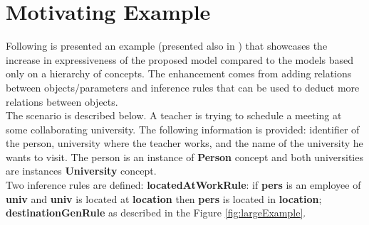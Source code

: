 \documentclass[12pt]{article}
\theoremstyle{definition}
\begin{document}
\section{Motivating Example}
Following is presented an example (presented also in \cite{paulRelational}) that showcases the increase in expressiveness of the proposed model compared to the models based only on a hierarchy of concepts. The enhancement comes from adding relations between objects/parameters and inference rules that can be used to deduct more relations between objects. \\
The scenario is described below. A teacher is trying to schedule a meeting at some collaborating university. The following information is provided: identifier of the person, university where the teacher works, and the name of the university he wants to visit. The person is an instance of \textbf{Person} concept and both universities are instances \textbf{University} concept. \\
Two inference rules are defined: \textbf{locatedAtWorkRule}: if \textbf{pers} is an employee of \textbf{univ} and \textbf{univ} is located at \textbf{location} then \textbf{pers} is located in \textbf{location}; \textbf{destinationGenRule} as described in the Figure \ref{fig:largeExample}.
\end{document}
